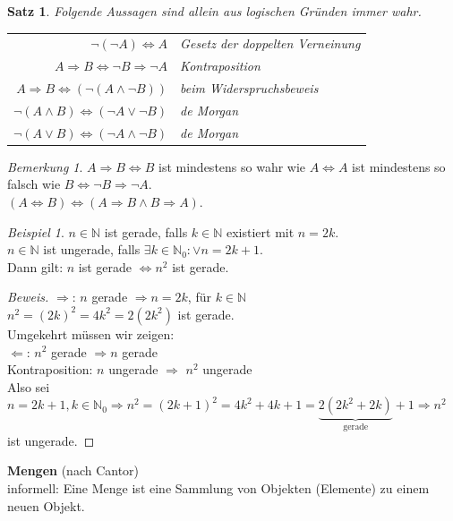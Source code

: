 \documentclass[12pt,a4paper,titlepage]{article} %
\newtheorem{satz}{Satz}[subsection]
\theoremstyle{definition}
\theoremstyle{remark}
\newtheorem*{bem}{Bemerkung}
\newtheorem*{bsp}{Beispiel}
\newenvironment{bew}{\begin{proof}[Beweis]}{\end{proof}}
\begin{document}
\begin{satz}
	Folgende Aussagen sind allein aus logischen Gründen immer wahr.
	\begin{tabular}{rl}
		$\neg(\neg A) \Leftrightarrow A$ & Gesetz der doppelten Verneinung\\
		$A \Rightarrow B \Leftrightarrow \neg B \Rightarrow \neg A$ & Kontraposition\\
		$A \Rightarrow B \Leftrightarrow (\neg (A \wedge \neg B))$ & beim Widerspruchsbeweis\\
		$\neg(A \wedge B) \Leftrightarrow (\neg A \vee \neg B)$ & de Morgan\\
		$\neg(A \vee B) \Leftrightarrow (\neg A \wedge \neg B)$ & de Morgan\\
	\end{tabular}
\end{satz}
\begin{bem}
	$A \Rightarrow B \Leftrightarrow B $ ist mindestens so wahr wie $A \Leftrightarrow A$ ist mindestens so falsch wie $B \Leftrightarrow \neg B \Rightarrow \neg A$.\\$(A\Leftrightarrow B) \Leftrightarrow (A \Rightarrow B \wedge B \Rightarrow A)$.
\end{bem}
\begin{bsp}
	$n \in \mathbb{N}$ ist gerade, falls $k \in \mathbb{N}$ existiert mit $n = 2k$.\\
	$n\in \mathbb{N}$ ist ungerade, falls $\exists k\in \mathbb{N}_0: \vee n = 2k+1$.\\
	Dann gilt: $n$ ist gerade $\Leftrightarrow n^2$ ist gerade.
	\begin{bew}
		\glqq $\Rightarrow$\grqq : $n$ gerade $\Rightarrow n=2k$, für $k\in \mathbb{N}$\\
		$n^2 = (2k)^2 = 4k^2 = 2(2k^2)$ ist gerade.\\
		Umgekehrt müssen wir zeigen:\\
		\glqq $\Leftarrow$\grqq : $n^2$ gerade $\Rightarrow n$ gerade\\
		Kontraposition: $n$ ungerade $\Rightarrow$ $n^2$ ungerade\\
		Also sei $n = 2k+1, k \in \mathbb{N}_0 \Rightarrow n^2 = (2k+1)^2 = 4k^2 + 4k + 1 = \underbrace{2(2k^2 + 2k)}_{\text{gerade}} + 1 \Rightarrow n^2$ ist ungerade. 
	\end{bew}
\end{bsp} 
\textbf{Mengen} (nach Cantor)\\
informell: Eine Menge ist eine Sammlung von Objekten (Elemente) zu einem neuen Objekt.\\
\end{document}
